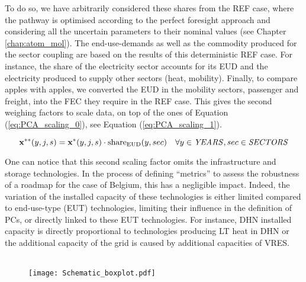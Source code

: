 To do so, we have arbitrarily considered these shares from the REF case, where the pathway is optimised according to the perfect foresight approach and considering all the uncertain parameters to their nominal values (see Chapter \ref{chap:atom_mol}).  The end-use-demands as well as the commodity produced for the sector coupling are based on the results of this deterministic REF case.  For instance, the share of the electricity sector accounts for its \gls{EUD} and the electricity produced to supply other sectors (\eg heat, mobility). Finally, to compare apples with apples, we converted the \gls{EUD} in the mobility sectors, \ie passenger and freight, into the \gls{FEC} they require in the REF case. This gives the second weighing factors to scale data, on top of the ones of Equation (\ref{eq:PCA_scaling_0}), see Equation (\ref{eq:PCA_scaling_1}).

\begin{equation}
 \label{eq:PCA_scaling_1}
\textbf{x}^{**}(y,j,s)=\textbf{x}^{*}(y,j,s)\cdot \text{share}_{\text{EUD}}(y,sec)
 \quad \forall y \in \text{\emph{YEARS}}, sec \in \text{\emph{SECTORS}}
\end{equation}

One can notice that this second scaling factor omits the infrastructure and storage technologies. In the process of defining ``metrics'' to assess the robustness of a roadmap for the case of Belgium, this has a negligible impact. Indeed, the variation of the installed capacity of these technologies is either limited compared to end-use-type (EUT) technologies, \ie limiting their influence in the definition of PCs, or directly linked to these EUT technologies. For instance, \gls{DHN} installed capacity is directly proportional to technologies producing \gls{LT} heat in \gls{DHN} or the additional capacity of the grid is caused by additional capacities of \gls{VRES}. \\

\newpage
{}\\

\begin{wrapfigure}{r}{3cm}
\centering
\captionsetup{justification=centering}
\texttt{[image: Schematic\_boxplot.pdf]}
\caption{}
\label{fig:Schematic_boxplot_methodo}
\end{wrapfigure}

